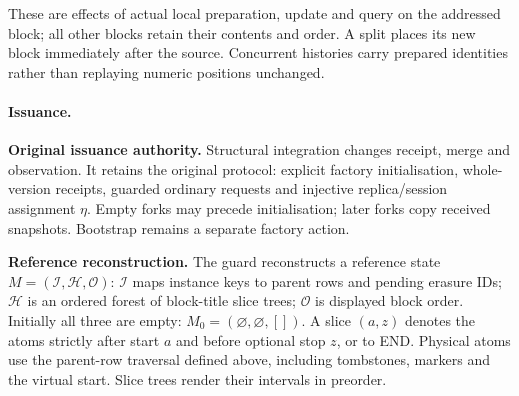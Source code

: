 These are effects of actual local preparation, update and query on the
addressed block; all other blocks retain their contents and order. A split
places its new block immediately after the source. Concurrent histories carry
prepared identities rather than replaying numeric positions unchanged.


\paragraph{Issuance.}
\textbf{Original issuance authority.} Structural integration changes receipt, merge and observation. It retains the original protocol: explicit factory initialisation, whole-version receipts, guarded ordinary requests and injective replica/session assignment $\eta$. Empty forks may precede initialisation; later forks copy received snapshots. Bootstrap remains a separate factory action.

\textbf{Reference reconstruction.} The guard reconstructs a reference state
$M=(\mathcal I,\mathcal H,\mathcal O)$: $\mathcal I$ maps instance keys to
parent rows and pending erasure IDs; $\mathcal H$ is an ordered forest of
block-title slice trees; $\mathcal O$ is displayed block order. Initially all
three are empty: $M_0=(\varnothing,\varnothing,[])$. A slice $(a,z)$ denotes the atoms strictly after start $a$
and before optional stop $z$, or to END. Physical atoms use the parent-row
traversal defined above, including tombstones, markers and the virtual start.
Slice trees render their intervals in preorder.

